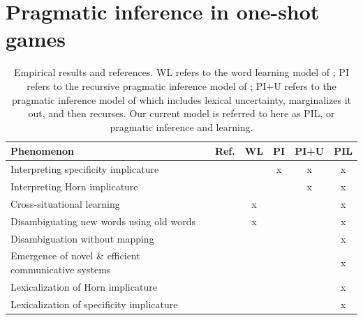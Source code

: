 \documentclass{article} %
\newcommand{\word}{\text{word}}
\newcommand{\obj}{\text{object}}
\newcommand{\lex}{\text{lexicon}}
\begin{document}
%
%
%
%
%

\section{Pragmatic inference in one-shot games}


\begin{table}[t]
\label{tab:results}
\begin{center}
\begin{tabular}{lccccc}
\toprule
Phenomenon & Ref. & WL & PI & PI+U & PIL \\
\midrule
Interpreting specificity implicature & \cite{grice1975} &  & x &x & x\\
Interpreting Horn implicature & \cite{horn1984} & &  & x& x\\
Cross-situational learning & \cite{smith2008} & x& & & x \\
Disambiguating new words using old words & \cite{markman1988} &x  & & & x \\
Disambiguation without mapping & \cite{horst2008} &  & & & x \\
Emergence of novel \& efficient communicative systems & \cite{galantucci2005} & & & & x \\
Lexicalization of Horn implicature & \cite{horn1984} & & & & x \\
Lexicalization of specificity implicature & \cite{levinson2000} & & & & x \\
\hline
\end{tabular}
\end{center}
\caption{Empirical results and references. WL refers to the word
  learning model of \cite{frank2009}; PI refers to the recursive
  pragmatic inference model of \cite{frank2012}; PI+U refers to the
  pragmatic inference model of \cite{bergen2012} which includes
  lexical uncertainty, marginalizes it out, and then recurses. Our
  current model is referred to here as PIL, or pragmatic inference and
  learning.}
\end{table}
\end{document}
